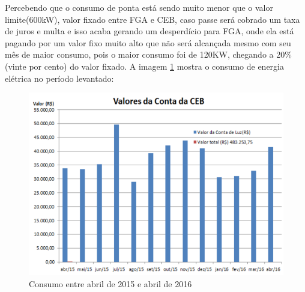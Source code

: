\par Percebendo que o consumo de ponta está sendo muito menor que o valor limite(600kW), valor fixado entre FGA e CEB, caso passe será cobrado um taxa de juros e multa e isso acaba gerando um desperdício para FGA, onde ela está pagando por um valor fixo muito alto que não será alcançada mesmo com seu mês de maior consumo, pois o maior consumo foi de 120KW, chegando a 20\% (vinte por cento) do valor fixado. A imagem \ref{fig:consumo} mostra o consumo de energia elétrica no período levantado:
\begin{figure}[!htb]
\centering
\includegraphics[width=0.65\paperwidth]{figuras/graficocontasCEB.png}
\caption{Consumo entre abril de 2015 e abril de 2016}
\label{fig:consumo}
\end{figure}




